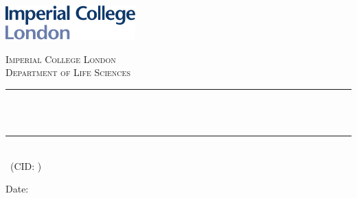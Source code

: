 \begin{titlepage}

    \newcommand{\HRule}{\rule{\linewidth}{0.3mm}} %
    
    
    \includegraphics[width = 5cm]{./imperial.pdf}\\[0.6cm] 
    
    \begin{center} %
    \vspace*{\fill}
    \textsc{\Large Imperial College London}\\[0.5cm] 
    \textsc{\large Department of Life Sciences}\\[0.5cm] 
    
    \HRule \\[0.4cm]
    { \huge \bfseries \reporttitle}\\ %
    \HRule \\[1.5cm]

    
   

    \reportauthor~(CID: \cid) %

    \vspace{1cm}
    \makeatletter
    Date: \@date \\
    \end{center}


    \vspace*{\fill}%

    
    \makeatother
    
    


    \end{titlepage}
    
    